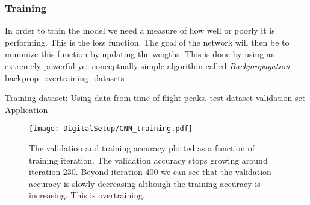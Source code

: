 \documentclass[main.tex]{subfiles}
\begin{document}
\subsubsection{Training}
In order to train the model we need a measure of how well or poorly it is performing. This is the loss function. The goal of the network will then be to minimize this function by updating the weigths. This is done by using an extremely powerful yet conceptually simple algorithm called \textit{Backpropagation}
-backprop
-overtraining
-datasets

Training dataset: Using data from time of flight peaks.
\newline test dataset
\newline validation set
\newline Application




\label{sec:cnn}
\begin{figure}[ht!]
    \centering
        \texttt{[image: DigitalSetup/CNN\_training.pdf]}
        \caption{The validation and training accuracy plotted as a function of training iteration. The validation accuracy stops growing around iteration 230. Beyond iteration 400 we can see that the validation accuracy is slowly decreasing although the training accuracy is increasing. This is overtraining.}
    \label{fig:CNN_training} 
\end{figure}
\end{document}
